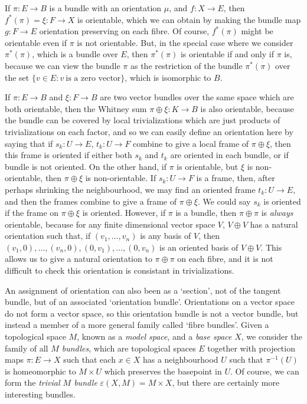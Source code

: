 \begin{example}
    If $\pi: E \to B$ is a bundle with an orientation $\mu$, and $f: X \to E$, then $f^*(\pi) = \xi: F \to X$ is orientable, which we can obtain by making the bundle map $g: F \to E$ orientation preserving on each fibre. Of course, $f^*(\pi)$ might be orientable even if $\pi$ is not orientable. But, in the special case where we consider $\pi^*(\pi)$, which is a bundle over $E$, then $\pi^*(\pi)$ is orientable if and only if $\pi$ is, because we can view the bundle $\pi$ as the restriction of the bundle $\pi^*(\pi)$ over the set $\{ v \in E: v\ \text{is a zero vector} \}$, which is isomorphic to $B$.
\end{example}

\begin{example}
    If $\pi: E \to B$ and $\xi: F \to B$ are two vector bundles over the same space which are both orientable, then the Whitney sum $\pi \oplus \xi: K \to B$ is also orientable, because the bundle can be covered by local trivializations which are just products of trivializations on each factor, and so we can easily define an orientation here by saying that if $s_k: U \to E$, $t_k: U \to F$ combine to give a local frame of $\pi \oplus \xi$, then this frame is oriented if either both $s_k$ and $t_k$ are oriented in each bundle, or if bundle is not oriented. On the other hand, if $\pi$ is orientable, but $\xi$ is non-orientable, then $\pi \oplus \xi$ is non-orientable. If $s_k: U \to F$ is a frame, then, after perhaps shrinking the neighbourhood, we may find an oriented frame $t_k: U \to E$, and then the frames combine to give a frame of $\pi \oplus \xi$. We could say $s_k$ is oriented if the frame on $\pi \oplus \xi$ is oriented. However, if $\pi$ is a bundle, then $\pi \oplus \pi$ is {\it always} orientable, because for any finite dimensional vector space $V$, $V \oplus V$ has a natural orientation such that, if $(v_1, \dots, v_n)$ is any basis of $V$, then $(v_1,0), \dots, (v_n,0), (0,v_1), \dots, (0,v_n)$ is an oriented basis of $V \oplus V$. This allows us to give a natural orientation to $\pi \oplus \pi$ on each fibre, and it is not difficult to check this orientation is consistant in trivializations.
\end{example}

An assignment of orientation can also been as a `section', not of the tangent bundle, but of an associated `orientation bundle'. Orientations on a vector space do not form a vector space, so this orientation bundle is not a vector bundle, but instead a member of a more general family called `fibre bundles'. Given a topological space $M$, known as a \emph{model space}, and a \emph{base space} $X$, we consider the family of all \emph{$M$ bundles}, which are topological spaces $E$ together with projection maps $\pi: E \to X$ such that each $x \in X$ has a neighbourhood $U$ such that $\pi^{-1}(U)$ is homeomorphic to $M \times U$ which preserves the basepoint in $U$. Of course, we can form the \emph{trivial $M$ bundle} $\varepsilon(X,M) = M \times X$, but there are certainly more interesting bundles.

